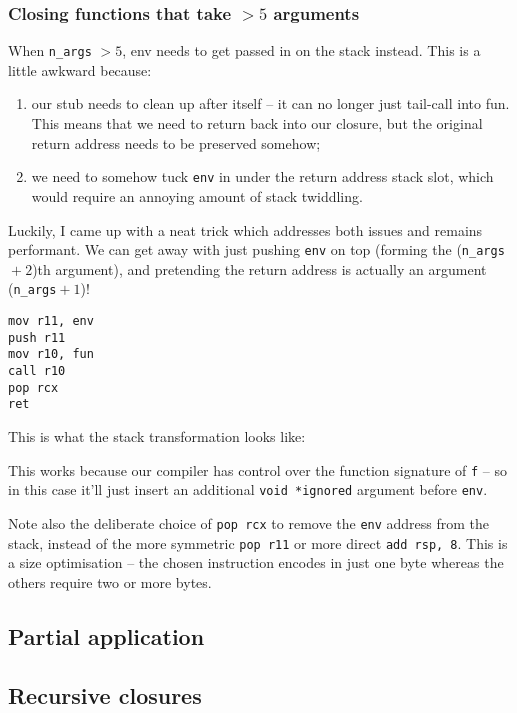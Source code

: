 \documentclass[12pt,a4paper,twoside,openright]{report}
\begin{document}
\subsubsection{Closing functions that take $> 5$ arguments}

When \lstinline{n_args} $> 5$, env needs to get passed in on the stack instead.
This is a little awkward because:
\begin{enumerate}
  \item our stub needs to clean up after itself -- it can no longer just tail-call into fun. This means that we need to return back into our closure, but the original return address needs to be preserved somehow;
  \item we need to somehow tuck \lstinline{env} in under the return address stack slot, which would require an annoying amount of stack twiddling.
\end{enumerate}

Luckily, I came up with a neat trick which addresses both issues and remains performant. We can get away with just pushing \lstinline{env} on top (forming the (\lstinline{n_args}${}+2$)th argument), and pretending the return address is actually an argument (\lstinline{n_args}${}+1$)!

\begin{lstlisting}
mov r11, env
push r11
mov r10, fun
call r10
pop rcx
ret
\end{lstlisting}

This is what the stack transformation looks like: %

This works because our compiler has control over the function signature of
\lstinline{f}
-- so in this case it'll just insert an additional \lstinline{void *ignored} argument before \lstinline{env}.

Note also the deliberate choice of \lstinline{pop rcx} to remove the \lstinline{env} address from the stack, instead of the more symmetric \lstinline{pop r11} or more direct \lstinline{add rsp, 8}. This is a size optimisation -- the chosen instruction encodes in just one byte whereas the others require two or more bytes.

\subsection{Partial application}

\subsection{Recursive closures}
\end{document}
